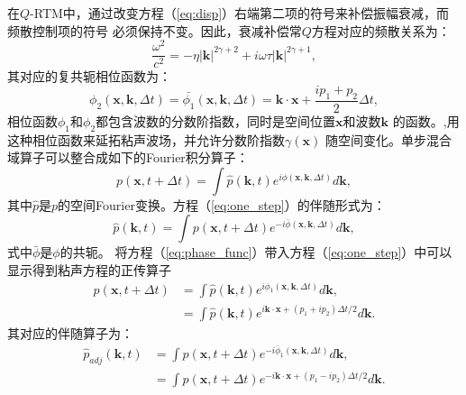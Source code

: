 在$Q$-RTM中，通过改变方程（\ref{eq:disp}）右端第二项的符号来补偿振幅衰减，而频散控制项的符号
必须保持不变。因此，衰减补偿常$Q$方程对应的频散关系为：
\begin{equation}
    \frac{\omega^2}{c^2}=-\eta|\mathbf{k}|^{2\gamma+2}+i\omega\tau|\mathbf{k}|^{2\gamma+1},
	\label{eq:disp1}
\end{equation}
其对应的复共轭相位函数为：
\begin{equation}
	\phi_2(\mathbf{x},\mathbf{k},\Delta t)=\bar{\phi_1}(\mathbf{x},\mathbf{k},\Delta t)
    =\mathbf{k}\cdot\mathbf{x}+\frac{ip_1+p_2}{2}\Delta t,
	\label{eq:phase_func1}
\end{equation}
相位函数$\phi_1$和$\phi_2$都包含波数的分数阶指数，同时是空间位置$\mathbf{x}$和波数$\mathbf{k}$
的函数。,用这种相位函数来延拓粘声波场，并允许分数阶指数$\gamma(\mathbf{x})$
随空间变化。单步混合域算子可以整合成如下的Fourier积分算子：
\begin{equation}
	p(\mathbf{x},t+\Delta t)=\int \hat{p}(\mathbf{k},t)e^{i\phi(\mathbf{x},\mathbf{k},\Delta t)}
	d\mathbf{k},
	\label{eq:one_step}
\end{equation}
其中$\hat{p}$是$p$的空间Fourier变换。方程（\ref{eq:one_step}）的伴随形式为：
\begin{equation}
	\hat{p}(\mathbf{k},t)=\int p(\mathbf{x},t+\Delta t)e^{-i\bar{\phi}(\mathbf{x},\mathbf{k},
	\Delta t)}d\mathbf{k},
\end{equation}
式中$\bar{\phi}$是$\phi$的共轭。
将方程（\ref{eq:phase_func}）带入方程（\ref{eq:one_step}）中可以显示得到粘声方程的正传算子
\begin{equation}
	\begin{aligned}
		p(\mathbf{x},t+\Delta t)&=\int \hat{p}(\mathbf{k},t)e^{i\phi_1(\mathbf{x},
		\mathbf{k},\Delta t)}d\mathbf{k}, \\
		&=\int \hat{p}(\mathbf{k},t)e^{i\mathbf{k}\cdot\mathbf{x}+(p_1+ip_2)\Delta t/2}d\mathbf{k}.
	\end{aligned}
	\label{eq:forward}
\end{equation}
其对应的伴随算子为：
\begin{equation}
	\begin{aligned}
		\hat{p}_{adj}(\mathbf{k},t)&=\int p(\mathbf{x},t+\Delta t)e^{-i\bar{\phi}_1(\mathbf{x},
		\mathbf{k},\Delta t)}d\mathbf{k}, \\
		&=\int \hat{p}(\mathbf{x},t+\Delta t)e^{-i\mathbf{k}\cdot\mathbf{x}+(p_1-ip_2)\Delta t/2}d\mathbf{k}.
	\end{aligned}
	\label{eq:adjoint}
\end{equation}
